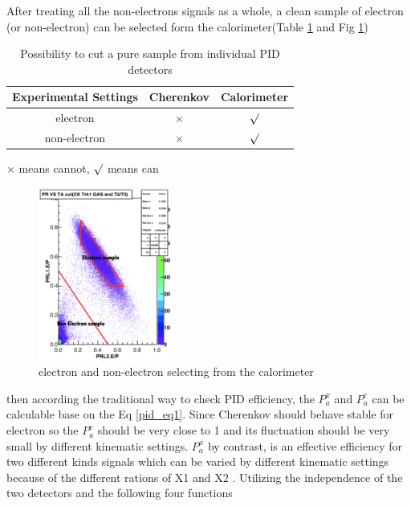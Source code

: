 After treating all the non-electrons signals as a whole, a clean sample of electron (or non-electron) can be selected form the calorimeter(Table \ref{sample2} and Fig \ref{sample3})
\begin{table}[!ht]
\large
\centering
 \caption{Possibility to cut a pure sample from individual PID detectors}\label{tab:tablenotes}
\begin{threeparttable}
\begin{tabular}[t]{|c|c|c|}\hline
  Experimental Settings & Cherenkov & Calorimeter  \\ \hline        
  electron          &   $\times$ & $\surd$ \\ \hline
  non-electron                &  $\times$  & $\surd$ \\  \hline
 \end{tabular}
\begin{tablenotes}
\centering
        \item[1]  $ \times $ means cannot, $ \surd $ means can
 \end{tablenotes}
\end{threeparttable}
\label{sample2}
 \end{table}
 
\begin{figure}
 	\begin{center}
 		\includegraphics[width=0.4\textwidth] {PID3.png}
 		\caption{electron and non-electron selecting from the calorimeter } \label{sample3}
 	\end{center}
\end{figure}   
 
 
then according the traditional way to check PID efficiency, the $P_{a}^{x}$ and $P_{a}^{e}$ can be calculable base on the Eq \ref{pid_eq1}. Since Cherenkov should behave stable for electron so the $P_{a}^{e}$ should be very close to 1 and its fluctuation should be very small by different kinematic settings. $P_{a}^{x}$ by contrast, is an effective efficiency for two different kinds signals which can be varied by different kinematic settings because of the different rations of X1 and X2 . Utilizing the independence of the two detectors and the following four functions

